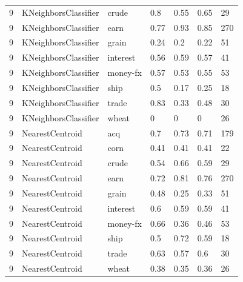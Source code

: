 \documentclass{article}
\begin{document}
\begin{table}[H]
\begin{tabular}{lllllll}
9             & KNeighborsClassifier   & crude           & 0.8                & 0.55            & 0.65              & 29               \\
9             & KNeighborsClassifier   & earn            & 0.77               & 0.93            & 0.85              & 270              \\
9             & KNeighborsClassifier   & grain           & 0.24               & 0.2             & 0.22              & 51               \\
9             & KNeighborsClassifier   & interest        & 0.56               & 0.59            & 0.57              & 41               \\
9             & KNeighborsClassifier   & money-fx        & 0.57               & 0.53            & 0.55              & 53               \\
9             & KNeighborsClassifier   & ship            & 0.5                & 0.17            & 0.25              & 18               \\
9             & KNeighborsClassifier   & trade           & 0.83               & 0.33            & 0.48              & 30               \\
9             & KNeighborsClassifier   & wheat           & 0                  & 0               & 0                 & 26               \\
9             & NearestCentroid        & acq             & 0.7                & 0.73            & 0.71              & 179              \\
9             & NearestCentroid        & corn            & 0.41               & 0.41            & 0.41              & 22               \\
9             & NearestCentroid        & crude           & 0.54               & 0.66            & 0.59              & 29               \\
9             & NearestCentroid        & earn            & 0.72               & 0.81            & 0.76              & 270              \\
9             & NearestCentroid        & grain           & 0.48               & 0.25            & 0.33              & 51               \\
9             & NearestCentroid        & interest        & 0.6                & 0.59            & 0.59              & 41               \\
9             & NearestCentroid        & money-fx        & 0.66               & 0.36            & 0.46              & 53               \\
9             & NearestCentroid        & ship            & 0.5                & 0.72            & 0.59              & 18               \\
9             & NearestCentroid        & trade           & 0.63               & 0.57            & 0.6               & 30               \\
9             & NearestCentroid        & wheat           & 0.38               & 0.35            & 0.36              & 26               \\\end{tabular}
\end{table}
\end{document}

